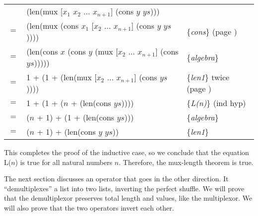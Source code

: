 \begin{center}
\begin{tabular}{lll}
    & (len(mux [$x_1$ $x_2$ $\dots$ $x_{n+1}$] (cons $y$ $ys$)))             &   \\
$=$ & (len(mux (cons $x_1$ [$x_2$ $\dots$ $x_{n+1}$] (cons $y$ $ys$))))      & \{\emph{cons}\} (page \pageref{first-rest-cons}) \\
$=$ & (len(cons $x$ (cons $y$ (mux [$x_2$ $\dots$ $x_{n+1}$] (cons $ys$))))) & \{\emph{algebra}\} \\
$=$ & 1 + (1 + (len(mux [$x_2$ $\dots$ $x_{n+1}$] (cons $ys$))))             & \{\emph{len1}\} twice (page \pageref{len-equations}) \\
$=$ & 1 + (1 + ($n$ + (len(cons $ys$))))                                     & \{\emph{L(n)}\} (ind hyp) \\
$=$ & ($n$ + 1) + (1 + (len(cons $ys$)))                                     & \{\emph{algebra}\} \\
$=$ & ($n$ + 1) + (len(cons $y$ $ys$))                                       & \{\emph{len1}\} \\
\end{tabular}
\end{center}

This completes the proof of the inductive case,
so we conclude that the equation L($n$) is true for all natural numbers $n$.
Therefore, the mux-length theorem is true.

The next section discusses an operator that goes in the other direction.
It ``demultiplexes'' a list into two lists, inverting the perfect shuffle.
We will prove that the demultiplexor preserves total length and values,
like the multiplexor.
We will also prove that the two operators invert each other.

